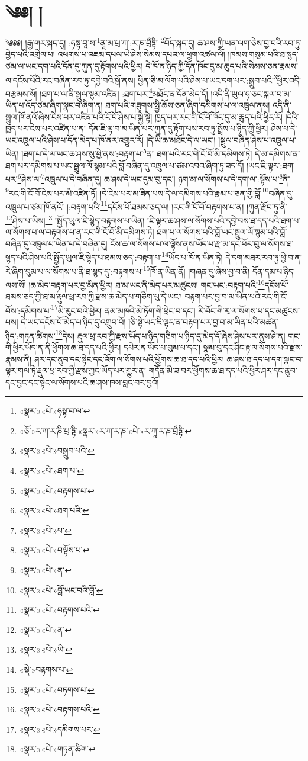 \chapter{༄༅། །}༄༅༅། །རྒྱ་གར་སྐད་དུ། :ཧསྟ་བཱ་ས་\footnote{«སྣར་»«པེ་»ཧསྟ་བ་ལ་}ནཱ་མ་པྲ་ཀ་:ར་ཎ་བྲྀཏྟི། \footnote{«ཅོ་»ར་ཀ་ར་ཎི་པྲ་ཏྟི་«སྣར་»ར་ཀ་ར་ཎ་«པེ་»ར་ཀཱ་ར་ཎ་བྲྀཏྟི་}བོད་སྐད་དུ། ཆ་ཤས་ཀྱི་ཡན་ལག་ཅེས་བྱ་བའི་རབ་ཏུ་བྱེད་པའི་འགྲེལ་པ། འཕགས་པ་འཇམ་དཔལ་ཡེ་ཤེས་སེམས་དཔའ་ལ་ཕྱག་འཚལ་ལོ། །ཁམས་གསུམ་པའི་ཐ་སྙད་ཙམ་ལ་ཡང་དག་པའི་དོན་དུ་ཀུན་དུ་རྟོགས་པའི་ཕྱིར། དེ་ཁོ་ན་ཉིད་ཀྱི་དོན་ཁོང་དུ་མ་ཆུད་པའི་སེམས་ཅན་རྣམས་ལ་དངོས་པོའི་རང་བཞིན་རབ་ཏུ་དབྱེ་བའི་སྒོ་ནས། ཕྱིན་ཅི་མ་ལོག་པའི་ཤེས་པ་ཡང་དག་པར་:སྒྲུབ་པའི་\footnote{«སྣར་»«པེ་»བསྒྲུབ་པའི་}ཕྱིར་འདི་བརྩམས་སོ། །ཐག་པ་ལ་ནི་སྦྲུལ་སྙམ་འཛིན། :ཐག་པར་\footnote{«སྣར་»«པེ་»ཐག་པ་}མཐོང་ན་དོན་མེད་དོ། །འདི་ནི་ཡུལ་ཧ་ཅང་སྐལ་བ་མ་ཡིན་པ་འོད་ཙམ་ཞིག་སྣང་བ་ཞིག་ན། ཐག་པའི་གཟུགས་སྤྱི་ཆོས་ཅན་ཞིག་དམིགས་པ་ལ་འཁྲུལ་ནས། འདི་ནི་སྦྲུལ་ཁོ་ནའོ་ཞེས་ངེས་པར་འཛིན་པའི་ངོ་བོ་ཤེས་པ་སྐྱེ་སྟེ། ཁྱད་པར་རང་གི་ངོ་བོ་ཁོང་དུ་མ་ཆུད་པའི་ཕྱིར་རོ། །དེའི་ཁྱད་པར་ངེས་པར་འཛིན་པ་ན། དོན་ཇི་ལྟ་བ་མ་ཡིན་པར་ཀུན་དུ་རྟོག་པས་རབ་ཏུ་སྤྲོས་པ་ཉིད་ཀྱི་ཕྱིར། ཤེས་པ་དེ་ཡང་འཁྲུལ་པའི་ཤེས་པ་དོན་མེད་པ་ཁོ་ནར་འགྱུར་རོ། །དེ་ཡི་ཆ་མཐོང་དེ་ལ་ཡང་། །སྦྲུལ་བཞིན་ཤེས་པ་འཁྲུལ་པ་ཡིན། །ཐག་པ་དེ་ལ་ཡང་ཆ་ཤས་སུ་ཕྱེ་ནས་:བརྟག་པ་\footnote{«སྣར་»«པེ་»བརྟགས་པ་}ན། ཐག་པའི་རང་གི་ངོ་བོ་མི་དམིགས་ཏེ། དེ་མ་དམིགས་ན་ཐག་པར་དམིགས་པ་ཡང་སྦྲུལ་ལོ་སྙམ་པའི་བློ་བཞིན་དུ་འཁྲུལ་པ་ཙམ་འབའ་ཞིག་ཏུ་ཟད་དོ། །ཡང་ཇི་ལྟར་:ཐག་པར་\footnote{«སྣར་»«པེ་»ཐག་པའི་}ཤེས་ལ་\footnote{«སྣར་»«པེ་»པ་}འཁྲུལ་པ་དེ་བཞིན་དུ། ཆ་ཤས་དེ་ཡང་དུམ་བུ་དང་། ཉག་མ་ལ་སོགས་པ་དེ་དག་ལ་:ལྟོས་པ་\footnote{«སྣར་»«པེ་»བལྟོས་པ་}ནི་\footnote{«སྣར་»«པེ་»ན་}རང་གི་ངོ་བོ་ངེས་པར་མི་འཛིན་ཏོ། །དེ་ངེས་པར་མ་ཟིན་པས་དེ་ལ་དམིགས་པའི་རྣམ་པ་ཅན་གྱི་བློ་\footnote{«སྣར་»«པེ་»བློ་ཡང་བའི་བློ་}བཞིན་དུ་འཁྲུལ་པ་ཙམ་ཁོ་ནའོ། །:བརྟག་པའི་\footnote{«སྣར་»«པེ་»བརྟགས་པའི་}དངོས་པོ་ཐམས་ཅད་ལ། །རང་གི་ངོ་བོ་བརྟགས་པ་ན། །ཀུན་རྫོབ་ཏུ་ནི་\footnote{«སྣར་»«པེ་»ན་}ཤེས་པ་ཡིས།\footnote{«སྣར་»«པེ་»ཡི།} །སྤྱོད་ཡུལ་ཇི་སྙེད་བརྟགས་པ་ཡིན། །ཇི་ལྟར་ཆ་ཤས་ལ་སོགས་པའི་དབྱེ་བས་ཐ་དད་པའི་ཐག་པ་ལ་སོགས་པ་ལ་བརྟགས་པ་ན་རང་གི་ངོ་བོ་མི་དམིགས་ཏེ། ཐག་པ་ལ་སོགས་པའི་བློ་ཡང་སྦྲུལ་ལོ་སྙམ་པའི་བློ་བཞིན་དུ་འཁྲུལ་པ་ཡིན་པ་དེ་བཞིན་དུ། ངོས་ཆ་ལ་སོགས་པ་ལ་ལྟོས་ནས་ཡོད་པ་རྫ་མ་དང་ཕོར་བུ་ལ་སོགས་ཐ་སྙད་པའི་ཤེས་པའི་སྤྱོད་ཡུལ་ཇི་སྙེད་པ་ཐམས་ཅད་:བརྟག་པ་\footnote{«སྡེ་»བརྟགས་པ་}ཡོད་པ་ཁོ་ན་ཡིན་ཏེ། དེ་དག་མཐར་རབ་ཏུ་ཕྱེ་བ་ན། རེ་ཞིག་བུམ་པ་ལ་སོགས་པ་ནི་ཐ་སྙད་དུ་:བརྟགས་པ་\footnote{«སྣར་»«པེ་»བཏགས་པ་}ཁོ་ན་ཡིན་ནོ། །གཞན་དུ་ཞེས་བྱ་བ་ནི། དོན་དམ་པ་ཉིད་ལས་སོ། །ཆ་མེད་བརྟག་པར་བྱ་མིན་ཕྱིར། ཐ་མ་ཡང་ནི་མེད་པར་མཚུངས། གང་ཡང་:བརྟག་པའི་\footnote{«སྣར་»«པེ་»བརྟགས་པའི་}དངོས་པོ་ཐམས་ཅད་ཀྱི་ཐ་མ་རྡུལ་ཕྲ་རབ་ཀྱི་རྫས་ཆ་མེད་པ་གཅིག་པུ་དེ་ཡང་། བརྟག་པར་བྱ་བ་མ་ཡིན་པའི་རང་གི་ངོ་བོས་:དམིགས་པ་\footnote{«སྣར་»«པེ་»དམིགས་པར་}མི་རུང་བའི་ཕྱིར། ནམ་མཁའི་མེ་ཏོག་གི་ཕྲེང་བ་དང་། རི་བོང་གི་རྭ་ལ་སོགས་པ་དང་མཚུངས་པས། དེ་ཡང་དངོས་པོ་མེད་པ་ཉིད་དུ་འགྲུབ་བོ། །ཅི་སྟེ་ཡང་ཇི་ལྟར་ན་བརྟག་པར་བྱ་བ་མ་ཡིན་པའི་མཚན་ཉིད་:གཏན་ཚིགས་\footnote{«སྣར་»«པེ་»གཏན་ཚིག་}དེས། རྡུལ་ཕྲ་རབ་ཀྱི་རྫས་ཡོད་པ་ཉིད་གཅིག་པ་ཉིད་དུ་མེད་དོ་ཞེས་ཤེས་པར་ནུས་ཤེ་ན། གང་གི་ཕྱིར་ཡོད་ན་ནི་ཕྱོགས་ཆ་ཐ་དད་པའི་ཕྱིར། དཔེར་ན་ཡོད་པ་བུམ་པ་དང་། སྣམ་བུ་དང་ཤིང་རྟ་ལ་སོགས་པའི་རྫས་རྣམས་ནི། ཤར་དང་ནུབ་དང་སྟེང་དང་འོག་ལ་སོགས་པའི་ཕྱོགས་ཆ་ཐ་དད་པའི་ཕྱིར། ཆ་ཤས་ཐ་དད་པ་དག་སྣང་བ་ལྟར་གལ་ཏེ་རྡུལ་ཕྲ་རབ་ཀྱི་རྫས་ཀྱང་ཡོད་པར་གྱུར་ན། གདོན་མི་ཟ་བར་ཕྱོགས་ཆ་ཐ་དད་པའི་ཕྱིར་ཤར་དང་ནུབ་དང་བྱང་དང་སྟེང་ལ་སོགས་པའི་ཆ་ཤས་ཁས་བླང་བར་བྱའོ། 